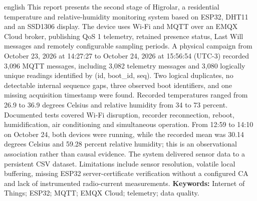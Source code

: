\begin{resumo}[Abstract]
\begin{otherlanguage*}{english}
This report presents the second stage of Higrolar, a residential temperature and relative-humidity monitoring system based on ESP32, DHT11 and an SSD1306 display. The device uses Wi-Fi and MQTT over an EMQX Cloud broker, publishing QoS 1 telemetry, retained presence status, Last Will messages and remotely configurable sampling periods. A physical campaign from October 23, 2026 at 14:27:27 to October 24, 2026 at 15:56:54 (UTC-3) recorded 3,096 MQTT messages, including 3,082 telemetry messages and 3,080 logically unique readings identified by (id, boot\_id, seq). Two logical duplicates, no detectable internal sequence gaps, three observed boot identifiers, and one missing acquisition timestamp were found. Recorded temperatures ranged from 26.9 to 36.9 degrees Celsius and relative humidity from 34 to 73 percent. Documented tests covered Wi-Fi disruption, recorder reconnection, reboot, humidification, air conditioning and simultaneous operation. From 12:59 to 14:10 on October 24, both devices were running, while the recorded mean was 30.14 degrees Celsius and 59.28 percent relative humidity; this is an observational association rather than causal evidence. The system delivered sensor data to a persistent CSV dataset. Limitations include sensor resolution, volatile local buffering, missing ESP32 server-certificate verification without a configured CA and lack of instrumented radio-current measurements.
\vspace{\onelineskip}
\noindent\textbf{Keywords:} Internet of Things; ESP32; MQTT; EMQX Cloud; telemetry; data quality.
\end{otherlanguage*}
\end{resumo}
